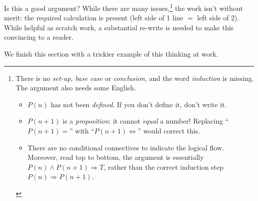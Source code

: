 Is this a good argument? While there are many issues,\footnote{%
	\textbullet\lstsp There is no \emph{set-up, base case} or \emph{conclusion}, and the word \emph{induction} is missing. The argument also needs some English.
	\begin{itemize}\itemsep0pt
	  \item $P(n)$ has not been \emph{defined}. If you don't define it, don't write it.
	  \item $P(n+1)$ is a \emph{proposition}: it cannot \emph{equal} a number! Replacing ``$P(n+1)=$'' with ``$P(n+1)\Longleftrightarrow$'' would correct this.
	  \item There are no conditional connectives to indicate the logical flow. Moreover, read top to bottom, the argument is essentially $P(n)\wedge P(n+1)\Longrightarrow T$, rather than the correct induction step $P(n)\Longrightarrow P(n+1)$.
	\end{itemize}
} the work isn't without merit: the required calculation is present (left side of 1\st{} line $=$ left side of 2\nd). While helpful as scratch work, a substantial re-write is needed to make this convincing to a reader.
\medbreak

We finish this section with a trickier example of this thinking at work.

